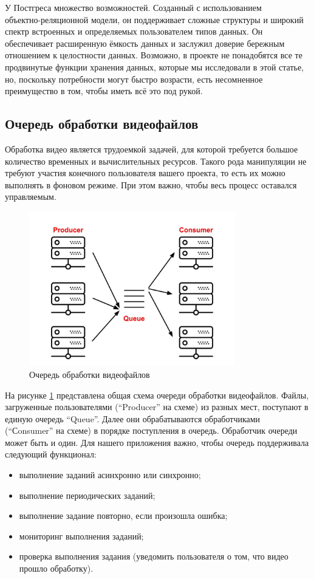 У Постгреса множество возможностей. Созданный с использованием\\ объектно-реляционной модели, он поддерживает сложные структуры
и широкий спектр встроенных и определяемых пользователем типов данных. Он обеспечивает расширенную ёмкость данных и
заслужил доверие бережным отношением к целостности данных. Возможно, в проекте не понадобятся все те продвинутые функции
хранения данных, которые мы исследовали в этой статье, но, поскольку потребности могут быстро возрасти, есть несомненное
преимущество в том, чтобы иметь всё это под рукой.

\subsection{Очередь обработки видеофайлов}

Обработка видео является трудоемкой задачей, для которой требуется большое количество временных
и вычислительных ресурсов. Такого рода манипуляции не требуют участия конечного пользователя
вашего проекта, то есть их можно выполнять в фоновом режиме. При этом важно,
чтобы весь процесс оставался управляемым.

\begin{figure}
  \centering
  \includegraphics[width=0.8\textwidth]{images/producer-consumer.jpg}
  \caption{Очередь обработки видеофайлов\label{producer-consumer}}
\end{figure}

На рисунке \ref{producer-consumer} представлена общая схема очереди обработки видеофайлов.
Файлы, загруженные пользователями (“Producer” на схеме) из разных мест,
поступают в единую очередь “Queue”. Далее они обрабатываются обработчиками (“Сonsumer” на схеме)
в порядке поступления в очередь. Обработчик очереди может быть и один.
Для нашего приложения важно, чтобы очередь поддерживала следующий функционал:
\begin{itemize}[wide,topsep=0pt]
  \itemsep0em
  \item выполнение заданий асинхронно или синхронно;
  \item выполнение периодических заданий;
  \item выполнение задание повторно, если произошла ошибка;
  \item мониторинг выполнения заданий;
  \item проверка выполнения задания (уведомить пользователя о том, что видео прошло обработку).
\end{itemize}

